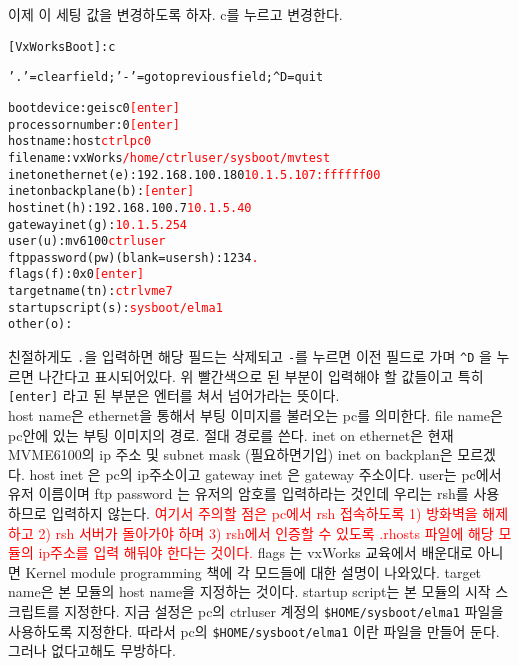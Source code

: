 \documentclass[11pt,a4paper]{article}
\begin{document}
이제 이 세팅 값을 변경하도록 하자. c를 누르고 변경한다. 
\begin{framed}
\begin{alltt}
[VxWorks Boot]: c

'.' = clear field;  '-' = go to previous field;  ^D = quit

boot device          : geisc0    		\textcolor{red}{[enter]}
processor number     : 0         		\textcolor{red}{[enter]}
host name            : host      		\textcolor{red}{ctrlpc0}
file name            : vxWorks			\textcolor{red}{/home/ctrluser/sysboot/mvtest}
inet on ethernet (e) : 192.168.100.180	\textcolor{red}{10.1.5.107:ffffff00}
inet on backplane (b): 				\textcolor{red}{[enter]}
host inet (h)        : 192.168.100.7 	\textcolor{red}{10.1.5.40}
gateway inet (g)     : 				\textcolor{red}{10.1.5.254}
user (u)             : mv6100 			\textcolor{red}{ctrluser}
ftp password (pw) (blank = use rsh): 1234 \textcolor{red}{.}
flags (f)            : 0x0  			\textcolor{red}{[enter]}
target name (tn)     : 				\textcolor{red}{ctrlvme7}
startup script (s)   : 				\textcolor{red}{sysboot/elma1}
other (o)            : 
\end{alltt}
\end{framed}
친절하게도 \verb|.|을 입력하면 해당 필드는 삭제되고 \verb|-|를 누르면 이전 필드로 가며 \verb|^D| 을 누르면 
나간다고 표시되어있다. 위 빨간색으로 된 부분이 입력해야 할 값들이고 특히 \verb|[enter]| 라고 된 부분은 엔터를 
쳐서 넘어가라는 뜻이다.\\

host name은 ethernet을 통해서 부팅 이미지를 불러오는 pc를 의미한다.
file name은 pc안에 있는 부팅 이미지의 경로. 절대 경로를 쓴다.
inet on ethernet은 현재 MVME6100의 ip 주소 및 subnet mask (필요하면기입)
inet on backplan은 모르겠다. host inet 은 pc의 ip주소이고 gateway inet 은 gateway 주소이다.
user는 pc에서 유저 이름이며 ftp password 는 유저의 암호를 입력하라는 것인데 우리는 rsh를 사용하므로 입력하지 않는다.
\textcolor{red}{여기서 주의할 점은 pc에서 rsh 접속하도록 1) 방화벽을 해제하고 2) rsh 서버가 돌아가야 하며 3) rsh에서 인증할 수 있도록 
.rhosts 파일에 해당 모듈의 ip주소를 입력 해둬야 한다는 것이다.}
flags 는 vxWorks 교육에서 배운대로 아니면 Kernel module programming 책에 각 모드들에 대한 설명이 나와있다.
target name은 본 모듈의 host name을 지정하는 것이다. startup script는 본 모듈의 시작 스크립트를 지정한다. 
지금 설정은 pc의 ctrluser 계정의 \verb|$HOME/sysboot/elma1| 파일을 사용하도록 지정한다. 
따라서 pc의 \verb|$HOME/sysboot/elma1| 이란 파일을 만들어 둔다. 그러나 없다고해도 무방하다.\\
\end{document}
